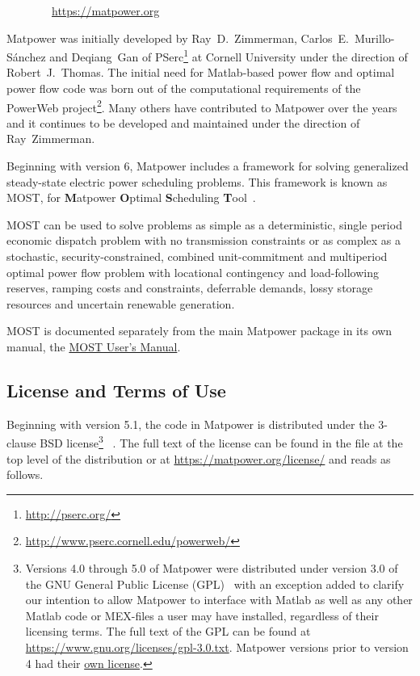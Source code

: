 \documentclass[12pt]{article}
\newcommand{\matlab}[0]{{\sc Matlab}}
\newcommand{\matpower}[0]{{\sc Matpower}}
\newcommand{\matpowerurl}[0]{https://matpower.org}
\newcommand{\most}[0]{{MOST}}
\newcommand{\mostname}[0]{{{\bf M}{\sc atpower} \textbf{O}ptimal \textbf{S}cheduling \textbf{T}ool}}
\newcommand{\mostver}[0]{1.0.2}
\newcommand{\pserc}[0]{{\sc PSerc}}
\newcommand{\code}[1]{{\relsize{-0.5}{\tt{{#1}}}}}  %
\newcommand{\mostmanurl}[0]{https://matpower.org/docs/MOST-manual-\mostver.pdf}
\newcommand{\mostman}[0]{\href{\mostmanurl}{\most{} User's Manual}}
\numberwithin{equation}{section}
\numberwithin{table}{section}
\numberwithin{figure}{section}
\begin{document}
\bigskip

~~~~~~~~\url{\matpowerurl}

\bigskip

\matpower{} was initially developed by Ray~D.~Zimmerman, Carlos~E.~Murillo-S\'anchez and Deqiang~Gan of \pserc{}\footnote{\url{http://pserc.org/}} at Cornell University under the direction of Robert~J.~Thomas. The initial need for \matlab{}-based power flow and optimal power flow code was born out of the computational requirements of the PowerWeb project\footnote{\url{http://www.pserc.cornell.edu/powerweb/}}. Many others have contributed to \matpower{} over the years and it continues to be developed and maintained under the direction of Ray~Zimmerman.

Beginning with version 6, \matpower{} includes a framework for solving generalized steady-state electric power scheduling problems. This framework is known as \most{}, for \mostname{}~\cite{murillo-sanchez2013a,lamadrid2018}.

\most{} can be used to solve problems as simple as a deterministic, single period economic dispatch problem with no transmission constraints or as complex as a stochastic, security-constrained, combined unit-commitment and multiperiod optimal power flow problem with locational contingency and load-following reserves, ramping costs and constraints, deferrable demands, lossy storage resources and uncertain renewable generation.

\most{} is documented separately from the main \matpower{} package in its own manual, the \mostman{}.

\pagebreak
\subsection{License and Terms of Use}

Beginning with version 5.1, the code in \matpower{} is distributed under the 3-clause BSD license\footnote{Versions 4.0 through 5.0 of \matpower{} were distributed under version 3.0 of the GNU General Public License (GPL)~\cite{gpl} with an exception added to clarify our intention to allow \matpower{} to interface with \matlab{} as well as any other \matlab{} code or MEX-files a user may have installed, regardless of their licensing terms. The full text of the GPL can be found at \url{https://www.gnu.org/licenses/gpl-3.0.txt}. \matpower{} versions prior to version 4 had their \href{https://matpower.org/license/old}{own license}.}
~\cite{bsd}. The full text of the license can be found in the \code{LICENSE} file at the top level of the distribution or at \url{https://matpower.org/license/} and reads as follows.
\end{document}
